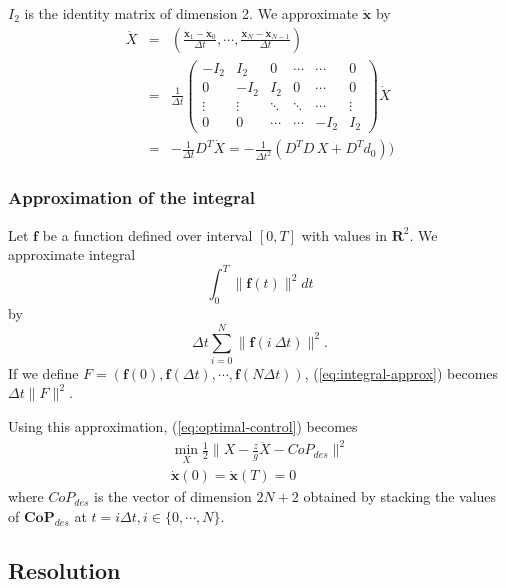 \documentclass{article}
\newcommand\vect[1]{\mathbf{#1}}
\newcommand\dx{\vect{\dot{x}}}
\newcommand\ddx{\vect{\ddot{x}}}
\begin{document}
$I_2$ is the identity matrix of dimension 2.
We approximate $\ddx$ by
\begin{eqnarray*}
  \ddot{X} &=& \left(\frac{\dx_1-\dx_0}{\Delta t}, \cdots, \frac{\dx_{N}-\dx_{N-1}}{\Delta t}\right)\\
  &=& \frac{1}{\Delta t}\left(\begin{array}{cccccc}
    -I_2   & I_2    & 0      & \cdots & \cdots & 0 \\
    0      & -I_2   & I_2    & 0      & \cdots & 0 \\
    \vdots & \vdots & \ddots & \ddots & \cdots &\vdots \\
    0      & 0      & \cdots & \cdots & -I_2   & I_2
  \end{array}\right) \dot{X} \\
  \label{eq:ddotX}
  &=& -\frac{1}{\Delta t} D^T \dot{X} = -\frac{1}{\Delta t^2} (D^TD\,X + D^Td_0))
\end{eqnarray*}

\subsubsection{Approximation of the integral}

Let $\mathbf{f}$ be a function defined over interval $[0,T]$ with values in $\mathbf{R}^2$. We approximate integral
\begin{equation}
\label{eq:integral}
\int_{0}^{T} \|\mathbf{f}(t)\|^2dt
\end{equation}
by
\begin{equation}\label{eq:integral-approx}
\Delta t \sum_{i=0}^N \|\mathbf{f}(i\ \Delta t)\|^2.
\end{equation}
If we define $F=(\mathbf{f}(0), \mathbf{f}(\Delta t),\cdots,\mathbf{f}(N\Delta t))$, (\ref{eq:integral-approx}) becomes $\Delta t\|F\|^2$.

Using this approximation, (\ref{eq:optimal-control}) becomes
\begin{equation}
  \begin{array}{l}
    \min_{X}\frac{1}{2}\|X - \frac{z}{g}\ddot{X} - CoP_{des}\|^2\\
    \dx(0)=\dx(T)=0
  \end{array}
  \label{eq:optimal-approx}
\end{equation}
where $CoP_{des}$ is the vector of dimension $2N+2$ obtained by stacking the values of $\vect{CoP}_{des}$ at $t=i\Delta t, i\in\{0,\cdots,N\}$.

\subsection{Resolution}
\end{document}
